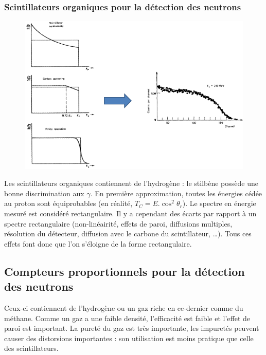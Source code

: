 \subsubsection{Scintillateurs organiques pour la détection des neutrons}
	\begin{figure}
	\vspace{-5mm}
	\includegraphics[scale=0.4]{ch11/image12}
	\end{figure}
Les scintillateurs organiques contiennent de l'hydrogène : le stilbène possède une bonne 
discrimination aux $\gamma$. En première approximation, toutes les énergies cédée au proton sont
équiprobables (en réalité, $T_C = E.\cos^2\theta_r$). Le spectre en énergie mesuré est considéré
rectangulaire. Il y a cependant des écarts par rapport à un spectre rectangulaire (non-linéairité, 
effets de paroi, diffusions multiples, résolution du détecteur, diffusion avec le carbone
du scintillateur, \dots). Tous ces effets font donc que l'on s'éloigne de la forme rectangulaire.

\newpage

\subsection{Compteurs proportionnels pour la détection des neutrons }
Ceux-ci contiennent de l'hydrogène ou un gaz riche en ce-dernier comme du méthane. Comme un gaz a une
faible densité, l'efficacité est faible et l'effet de paroi est important. La pureté du gaz est
très importante, les impuretés peuvent causer des distorsions importantes : son utilisation est
moins pratique que celle des scintillateurs.


